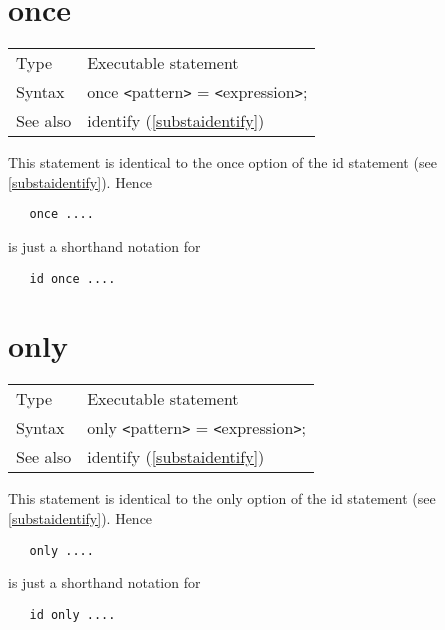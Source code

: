  
\vspace{10mm}

 
\section{once}
\label{substaonce}

\noindent \begin{tabular}{ll}
Type & Executable statement\\
Syntax & once {\tt<}pattern{\tt>} = {\tt<}expression{\tt>};
\\ See also & identify (\ref{substaidentify})
\end{tabular} \vspace{4mm}

\noindent This statement is identical to the once option of the 
id statement (see \ref{substaidentify}). Hence
\begin{verbatim}
   once ....
\end{verbatim}
is just a shorthand notation for
\begin{verbatim}
   id once ....
\end{verbatim}
\vspace{10mm}

 
\section{only}
\label{substaonly}

\noindent \begin{tabular}{ll}
Type & Executable statement\\
Syntax & only {\tt<}pattern{\tt>} = {\tt<}expression{\tt>};
\\ See also & identify (\ref{substaidentify})
\end{tabular} \vspace{4mm}

\noindent This statement is identical to the only option of the 
id statement (see \ref{substaidentify}). Hence
\begin{verbatim}
   only ....
\end{verbatim}
is just a shorthand notation for
\begin{verbatim}
   id only ....
\end{verbatim}
\vspace{10mm}

